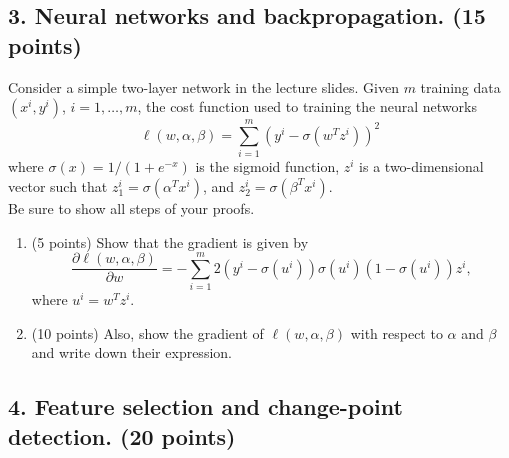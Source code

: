 \documentclass[twoside,10pt]{article}
\begin{document}
\subsection*{3. Neural networks and backpropagation. (15 points)}


Consider a simple two-layer network in the lecture slides. Given $m$ training data $(x^i, y^i)$, $i = 1, \ldots, m$, the cost function used to training the neural networks
\[
\ell(w, \alpha, \beta) = \sum_{i=1}^m (y^i - \sigma(w^T z^i))^2
\]
where $\sigma (x) = 1/(1+e^{-x})$ is the sigmoid function, $z^i$ is a two-dimensional vector such that  $z_1^i = \sigma(\alpha^T x^i)$, and $z_2^i = \sigma(\beta^T x^i)$.
\\
Be sure to show all steps of your proofs.

\begin{enumerate}
\item (5 points) Show that the gradient is given by
\[
\frac{\partial \ell(w, \alpha, \beta) }{\partial w}
= - \sum_{i=1}^m 2(y^i - \sigma(u^i))\sigma(u^i)(1-\sigma(u^i)) z^i,
\]
where $u^i = w^T z^i$. 
\item (10 points) Also, show the gradient of $\ell(w, \alpha, \beta)$ with respect to $\alpha$ and $\beta$ and write down their expression.
\end{enumerate}


\subsection*{4. Feature selection and change-point detection. (20 points)} 
\end{document}
